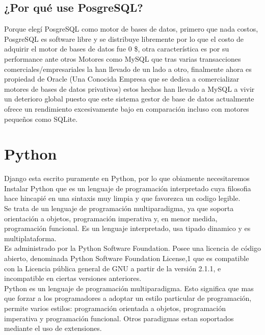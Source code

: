 \subsection{¿Por qué use PosgreSQL?}

Porque elegí PosgreSQL como motor de bases de datos, primero que nada costos, PosgreSQL es software libre y se distribuye libremente por lo que el costo de adquirir el motor de bases de datos fue 0 \$,  otra característica es por su performance ante otros Motores como MySQL que tras varias transacciones comerciales/empresariales la han llevado de un lado a otro, finalmente ahora es propiedad de Oracle (Una Conocida Empresa que se dedica a comercializar motores de bases de datos privativos) estos hechos han llevado a MySQL a vivir un deterioro global puesto que este sistema gestor de base de datos actualmente ofrece un rendimiento excesivamente bajo en comparación incluso con motores pequeños como SQLite.



\section{Python}

Django esta escrito puramente en Python, por lo que obiamente necesitaremos Instalar Python que es un lenguaje de programación interpretado cuya filosofia hace  hincapié en una sintaxis muy limpia y que favorezca un codigo legible. \\[0.1cm]
 
Se trata de un lenguaje de programación multiparadigma, ya que soporta orientación a objetos, programación imperativa y, en menor medida, programación funcional. Es un lenguaje interpretado, usa tipado dinamico y es multiplataforma. \\[0.1cm]

Es administrado por la Python Software Foundation. Posee una licencia de código abierto, denominada Python Software Foundation License,1 que es compatible con la Licencia pública general de GNU a partir de la versión 2.1.1, e incompatible en ciertas versiones anteriores. \\[0.1cm]

Python es un lenguaje de programación multiparadigma. Esto significa que mas que forzar a los programadores a adoptar un estilo particular de programación, permite varios estilos: programación orientada a objetos, programación imperativa y programación funcional. Otros paradigmas estan soportados mediante el uso de extensiones. \\[0.1cm]


